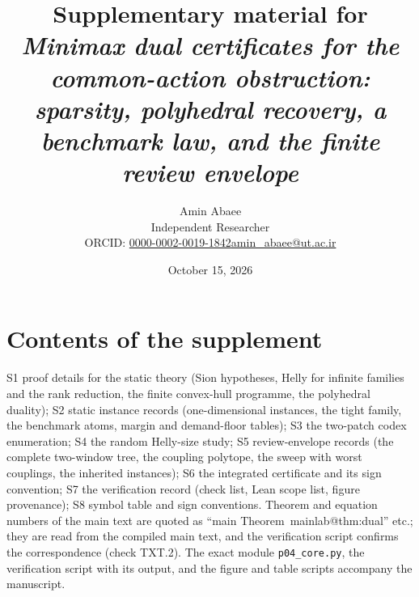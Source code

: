\documentclass[11pt,a4paper]{article}
\makeatletter
\theoremstyle{plain}
\theoremstyle{definition}
\theoremstyle{remark}
\newcommand{\mref}[1]{\csname mainlab@#1\endcsname}
\makeatother
\begin{document}
\title{\textbf{Supplementary material for}\\ \emph{Minimax dual certificates for the common-action obstruction: sparsity, polyhedral recovery, a benchmark law, and the finite review envelope}}
\author{Amin Abaee\\[0.3em]{\small Independent Researcher}\\[0.2em]{\small ORCID: \href{https://orcid.org/0000-0002-0019-1842}{0000-0002-0019-1842}\quad \href{mailto:amin_abaee@ut.ac.ir}{amin\_abaee@ut.ac.ir}}}
\date{October 15, 2026}
\maketitle

\section*{Contents of the supplement}
S1 proof details for the static theory (Sion hypotheses, Helly for infinite families and the rank reduction, the finite convex-hull programme, the polyhedral duality); S2 static instance records (one-dimensional instances, the tight family, the benchmark atoms, margin and demand-floor tables); S3 the two-patch codex enumeration; S4 the random Helly-size study; S5 review-envelope records (the complete two-window tree, the coupling polytope, the sweep with worst couplings, the inherited instances); S6 the integrated certificate and its sign convention; S7 the verification record (check list, Lean scope list, figure provenance); S8 symbol table and sign conventions. Theorem and equation numbers of the main text are quoted as ``main Theorem~\mref{thm:dual}'' etc.; they are read from the compiled main text, and the verification script confirms the correspondence (check TXT.2). The exact module \texttt{p04\_core.py}, the verification script  with its output, and the figure and table scripts accompany the manuscript.
\end{document}
